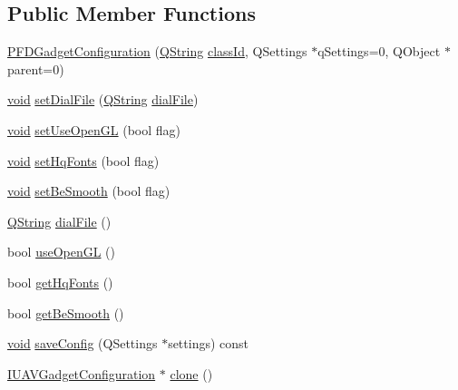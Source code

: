 \subsection*{Public Member Functions}
\begin{DoxyCompactItemize}
\item 
\hyperlink{group___o_p_map_plugin_gacb5ca139ed284444e5e173641b6001bd}{P\-F\-D\-Gadget\-Configuration} (\hyperlink{group___u_a_v_objects_plugin_gab9d252f49c333c94a72f97ce3105a32d}{Q\-String} \hyperlink{group___core_plugin_gac953657221ba7fda967ada0408332641}{class\-Id}, Q\-Settings $\ast$q\-Settings=0, Q\-Object $\ast$parent=0)
\item 
\hyperlink{group___u_a_v_objects_plugin_ga444cf2ff3f0ecbe028adce838d373f5c}{void} \hyperlink{group___o_p_map_plugin_gae14181eda65a05f6f8ad21aa6a531aaa}{set\-Dial\-File} (\hyperlink{group___u_a_v_objects_plugin_gab9d252f49c333c94a72f97ce3105a32d}{Q\-String} \hyperlink{group___o_p_map_plugin_ga0c75d60343b097f8da312d96e5fa8a68}{dial\-File})
\item 
\hyperlink{group___u_a_v_objects_plugin_ga444cf2ff3f0ecbe028adce838d373f5c}{void} \hyperlink{group___o_p_map_plugin_ga8a6a328024b4a742149d9922328a014b}{set\-Use\-Open\-G\-L} (bool flag)
\item 
\hyperlink{group___u_a_v_objects_plugin_ga444cf2ff3f0ecbe028adce838d373f5c}{void} \hyperlink{group___o_p_map_plugin_gaf36027ad5fc6d02f4433df45538cef4f}{set\-Hq\-Fonts} (bool flag)
\item 
\hyperlink{group___u_a_v_objects_plugin_ga444cf2ff3f0ecbe028adce838d373f5c}{void} \hyperlink{group___o_p_map_plugin_ga8a3abfa9447e111ebdfdddb6b005be4b}{set\-Be\-Smooth} (bool flag)
\item 
\hyperlink{group___u_a_v_objects_plugin_gab9d252f49c333c94a72f97ce3105a32d}{Q\-String} \hyperlink{group___o_p_map_plugin_ga0c75d60343b097f8da312d96e5fa8a68}{dial\-File} ()
\item 
bool \hyperlink{group___o_p_map_plugin_ga9ee42411026741bf10767ec9bddf4f5e}{use\-Open\-G\-L} ()
\item 
bool \hyperlink{group___o_p_map_plugin_ga618cd55f8f758294cbed557e9e610eb6}{get\-Hq\-Fonts} ()
\item 
bool \hyperlink{group___o_p_map_plugin_ga50b05c372ea7566767fee660a4e811f3}{get\-Be\-Smooth} ()
\item 
\hyperlink{group___u_a_v_objects_plugin_ga444cf2ff3f0ecbe028adce838d373f5c}{void} \hyperlink{group___o_p_map_plugin_ga31f17afc274f0b137893d28f61adb4ca}{save\-Config} (Q\-Settings $\ast$settings) const 
\item 
\hyperlink{group___core_plugin_gacdfdf0b1e39b5002472b76b6564ce51f}{I\-U\-A\-V\-Gadget\-Configuration} $\ast$ \hyperlink{group___o_p_map_plugin_gabe4d60a242c6090fd1df05c1da47e165}{clone} ()
\end{DoxyCompactItemize}


